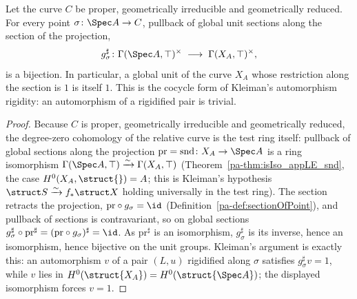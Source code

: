 \begin{theorem}
  \label{pa-thm:unitsAppTop_sectionOfPoint_bijective}
  \leanok

  Let the curve \(C\) be proper, geometrically irreducible and geometrically reduced. For every
  point \(\sigma \colon \Spec A \to C\), pullback of global unit sections along the section of the
  projection,
  \[
    g_\sigma^{\sharp} \colon \Gamma(\Spec A, \top)^{\times}
      \;\longrightarrow\; \Gamma(X_A, \top)^{\times},
  \]
  is a bijection. In particular, a global unit of the curve \(X_A\) whose restriction along the
  section is \(1\) is itself \(1\). This is the cocycle form of Kleiman's automorphism rigidity: an
  automorphism of a rigidified pair is trivial.
\end{theorem}
\begin{proof}
  \leanok
  Because \(C\) is proper, geometrically irreducible and geometrically reduced, the degree-zero
  cohomology of the relative curve is the test ring itself: pullback of global sections along the
  projection \(\mathrm{pr} = \mathrm{snd} \colon X_A \to \Spec A\) is a ring isomorphism
  \(\Gamma(\Spec A, \top) \xrightarrow{\sim} \Gamma(X_A, \top)\)
  (Theorem~\ref{pa-thm:isIso_appLE_snd}, the case \(H^0(X_A, \struct{}) = A\); this is Kleiman's
  hypothesis \(\struct S \xrightarrow{\sim} f_{*}\struct X\) holding universally in the test ring).
  The section retracts the projection, \(\mathrm{pr} \circ g_\sigma = \id\)
  (Definition~\ref{pa-def:sectionOfPoint}), and pullback of sections is contravariant, so on global
  sections \(g_\sigma^{\sharp} \circ \mathrm{pr}^{\sharp} = (\mathrm{pr} \circ g_\sigma)^{\sharp} =
  \id\). As \(\mathrm{pr}^{\sharp}\) is an isomorphism, \(g_\sigma^{\sharp}\) is its inverse, hence
  an isomorphism, hence bijective on the unit groups. Kleiman's argument is exactly this: an
  automorphism \(v\) of a pair \((L, u)\) rigidified along \(\sigma\) satisfies
  \(g_\sigma^{\sharp} v = 1\), while \(v\) lies in \(H^0(\struct{X_A}) = H^0(\struct{\Spec A})\); the
  displayed isomorphism forces \(v = 1\).
\end{proof}

